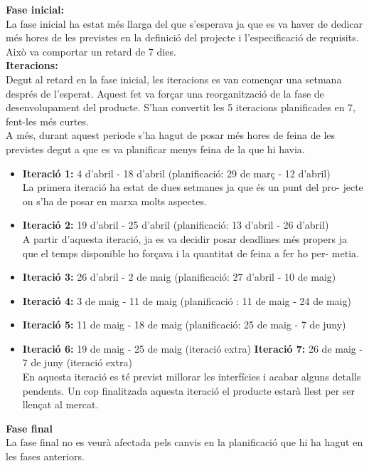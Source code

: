 \textbf{Fase inicial:}\\
La fase inicial ha estat més llarga del que s’esperava ja que es va haver de dedicar més hores de les previstes en la definició del projecte i l’especificació de
requisits. Això va comportar un retard de 7 dies.\\

\textbf{Iteracions:}\\
Degut al retard en la fase inicial, les iteracions es van començar una setmana després de l’esperat. Aquest fet va forçar una reorganització de la fase de
desenvolupament del producte. S’han convertit les 5 iteracions planificades en
7, fent-les més curtes.\\
A més, durant aquest periode s’ha hagut de posar més hores de feina de les
previstes degut a que es va planificar menys feina de la que hi havia.
\begin{itemize}
\item{}\textbf{Iteració 1:} 4 d’abril - 18 d’abril (planificació: 29 de març - 12 d’abril)\\
La primera iteració ha estat de dues setmanes ja que és un punt del pro-
jecte on s’ha de posar en marxa molts aspectes.
\item{}\textbf{Iteració 2:} 19 d’abril - 25 d’abril (planificació: 13 d’abril - 26 d’abril)\\
A partir d’aquesta iteració, ja es va decidir posar deadlines més propers
ja que el temps disponible ho forçava i la quantitat de feina a fer ho per-
metia.
\item{}\textbf{Iteració 3:} 26 d’abril - 2 de maig (planificació: 27 d’abril - 10 de maig)
\item{}\textbf{Iteració 4:} 3 de maig - 11 de maig (planificació : 11 de maig - 24 de maig)
\item{}\textbf{Iteració 5:} 11 de maig - 18 de maig (planificació: 25 de maig - 7 de juny)
\item{}\textbf{Iteració 6:} 19 de maig - 25 de maig (iteració extra)
\textbf{Iteració 7:} 26 de maig - 7 de juny (iteració extra)\\
En aquesta iteració es té previst millorar les interfícies i acabar alguns detalls pendents. Un cop finalitzada aquesta iteració el producte estarà llest
per ser llençat al mercat.
\end{itemize}

\textbf{Fase final}\\
La fase final no es veurà afectada pels canvis en la planificació que hi ha hagut en les fases anteriors.\\

